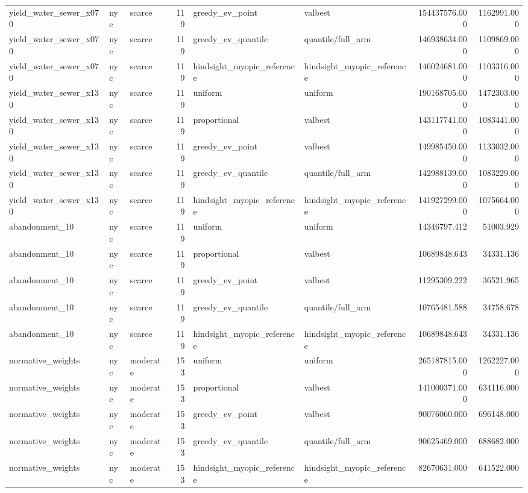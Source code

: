 \begin{tabular}{lllrllrr}
yield\_water\_sewer\_x070 & nyc & scarce & 119 & greedy\_ev\_point & valbest & 154437576.000 & 1162991.000 \\
yield\_water\_sewer\_x070 & nyc & scarce & 119 & greedy\_ev\_quantile & quantile/full\_arm & 146938634.000 & 1109869.000 \\
yield\_water\_sewer\_x070 & nyc & scarce & 119 & hindsight\_myopic\_reference & hindsight\_myopic\_reference & 146024681.000 & 1103316.000 \\
yield\_water\_sewer\_x130 & nyc & scarce & 119 & uniform & uniform & 190168705.000 & 1472303.000 \\
yield\_water\_sewer\_x130 & nyc & scarce & 119 & proportional & valbest & 143117741.000 & 1083441.000 \\
yield\_water\_sewer\_x130 & nyc & scarce & 119 & greedy\_ev\_point & valbest & 149985450.000 & 1133032.000 \\
yield\_water\_sewer\_x130 & nyc & scarce & 119 & greedy\_ev\_quantile & quantile/full\_arm & 142988139.000 & 1083229.000 \\
yield\_water\_sewer\_x130 & nyc & scarce & 119 & hindsight\_myopic\_reference & hindsight\_myopic\_reference & 141927299.000 & 1075664.000 \\
abandonment\_10 & nyc & scarce & 119 & uniform & uniform & 14346797.412 & 51003.929 \\
abandonment\_10 & nyc & scarce & 119 & proportional & valbest & 10689848.643 & 34331.136 \\
abandonment\_10 & nyc & scarce & 119 & greedy\_ev\_point & valbest & 11295309.222 & 36521.965 \\
abandonment\_10 & nyc & scarce & 119 & greedy\_ev\_quantile & quantile/full\_arm & 10765481.588 & 34758.678 \\
abandonment\_10 & nyc & scarce & 119 & hindsight\_myopic\_reference & hindsight\_myopic\_reference & 10689848.643 & 34331.136 \\
normative\_weights & nyc & moderate & 153 & uniform & uniform & 265187815.000 & 1262227.000 \\
normative\_weights & nyc & moderate & 153 & proportional & valbest & 141000371.000 & 634116.000 \\
normative\_weights & nyc & moderate & 153 & greedy\_ev\_point & valbest & 90076060.000 & 696148.000 \\
normative\_weights & nyc & moderate & 153 & greedy\_ev\_quantile & quantile/full\_arm & 90625469.000 & 688682.000 \\
normative\_weights & nyc & moderate & 153 & hindsight\_myopic\_reference & hindsight\_myopic\_reference & 82670631.000 & 641522.000 \\

\end{tabular}
